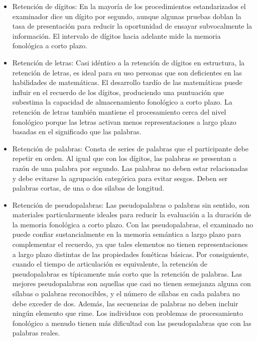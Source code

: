 \documentclass[12pt,letterpaper,final]{article}
\begin{document}
\begin{itemize}
	\item Retención de dígitos:
	En la mayoría de los procedimientos estandarizados el examinador dice un dígito por segundo, aunque algunas pruebas doblan la tasa de presentación para reducir la oportunidad de ensayar subvocalmente la información. El intervalo de dígitos hacia adelante mide la memoria fonológica a corto plazo.%

	\item Retención de letras:
	Casi idéntico a la retención de dígitos en estructura, la retención de letras, %
	es ideal para su uso personas que son deficientes en las habilidades de matemáticas. El desarrollo tardío de las matemáticas puede influir en el recuerdo de los dígitos, produciendo una puntuación que subestima la capacidad de almacenamiento fonológico a corto plazo. La retención de letras también mantiene el procesamiento cerca del nivel fonológico porque las letras activan menos representaciones a largo plazo basadas en el significado que las palabras.

	\item Retención de palabras:
	Consta de series de palabras que el participante debe repetir en orden. Al igual que con los dígitos, las palabras se presentan a razón de una palabra por segundo. Las palabras no deben estar relacionadas y debe evitarse la agrupación categórica para evitar sesgos. Deben ser palabras cortas, de una o dos silabas de longitud.

	\item Retención de pseudopalabras:
	Las pseudopalabras o palabras sin sentido, son materiales particularmente ideales para reducir la evaluación a la duración de la memoria fonológica a corto plazo. Con las pseudopalabras, el examinado no puede confiar sustancialmente en la memoria semántica a largo plazo para complementar el recuerdo, ya que tales elementos no tienen representaciones a largo plazo distintas de las propiedades fonéticas básicas. Por consiguiente, cuando el tiempo de articulación es equivalente, la retención de pseudopalabras es típicamente más corto que la retención de palabras. Las mejores pseudopalabras son aquellas que casi no tienen semejanza alguna con sílabas o palabras reconocibles, y el número de sílabas en cada palabra no debe exceder de dos. Además, las secuencias de palabras no deben incluir ningún elemento que rime. Los individuos con problemas de procesamiento fonológico a menudo tienen más dificultad con las pseudopalabras que con las palabras reales.


\end{itemize}
\end{document}
